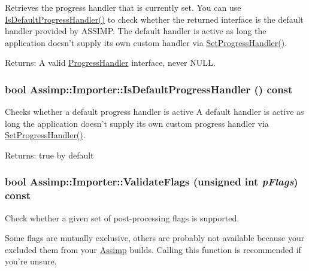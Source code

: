 Retrieves the progress handler that is currently set. You can use \hyperlink{class_assimp_1_1_importer_2d60d970eddf8f9d35b6e9b54214cedd}{IsDefaultProgressHandler()} to check whether the returned interface is the default handler provided by ASSIMP. The default handler is active as long the application doesn't supply its own custom handler via \hyperlink{class_assimp_1_1_importer_6a4d830ffb3f77a3c7c919e0af006920}{SetProgressHandler()}. \begin{Desc}
\item[Returns:]A valid \hyperlink{class_assimp_1_1_progress_handler}{ProgressHandler} interface, never NULL. \end{Desc}
\hypertarget{class_assimp_1_1_importer_2d60d970eddf8f9d35b6e9b54214cedd}{
\subsubsection[IsDefaultProgressHandler]{\setlength{\rightskip}{0pt plus 5cm}bool Assimp::Importer::IsDefaultProgressHandler () const}}
\label{class_assimp_1_1_importer_2d60d970eddf8f9d35b6e9b54214cedd}


Checks whether a default progress handler is active A default handler is active as long the application doesn't supply its own custom progress handler via \hyperlink{class_assimp_1_1_importer_6a4d830ffb3f77a3c7c919e0af006920}{SetProgressHandler()}. \begin{Desc}
\item[Returns:]true by default \end{Desc}
\hypertarget{class_assimp_1_1_importer_780329e2dd0406e930291cf8ab9deb99}{
\subsubsection[ValidateFlags]{\setlength{\rightskip}{0pt plus 5cm}bool Assimp::Importer::ValidateFlags (unsigned int {\em pFlags}) const}}
\label{class_assimp_1_1_importer_780329e2dd0406e930291cf8ab9deb99}


Check whether a given set of post-processing flags is supported. 

Some flags are mutually exclusive, others are probably not available because your excluded them from your \hyperlink{namespace_assimp}{Assimp} builds. Calling this function is recommended if you're unsure.

